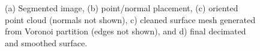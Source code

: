 \begin{figure}[]
{\label{fig:shabakaseq4}}
%
\caption{(a) Segmented image, (b) point/normal placement, (c) oriented point cloud (normals not shown), c) cleaned surface mesh generated from Voronoi partition (edges not shown), and d) final decimated and smoothed surface.}
\label{fig:shabakaseq}
\end{figure}


